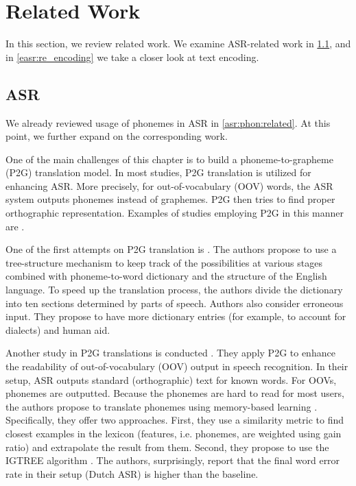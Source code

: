 \section{Related Work}
\label{easr:related}
In this section, we review related work. We examine ASR-related work in \cref{easr:rel_asr}, and in \cref{easr:re_encoding} we take a closer look at text encoding.

\subsection{ASR}
\label{easr:rel_asr}
We already reviewed usage of phonemes in ASR in \cref{asr:phon:related}. At this point, we further expand on the corresponding work.

One of the main challenges of this chapter is to build a phoneme-to-grapheme (P2G) translation model. In most studies, P2G translation is utilized for enhancing ASR. More precisely, for out-of-vocabulary (OOV) words, the ASR system outputs phonemes instead of graphemes. P2G then tries to find proper orthographic representation. Examples of studies employing P2G in this manner are .

One of the first attempts on P2G translation is . The authors propose to use a tree-structure mechanism to keep track of the possibilities at various stages combined with phoneme-to-word dictionary and the structure of the English language. To speed up the translation process, the authors divide the dictionary into ten sections determined by parts of speech. Authors also consider erroneous input. They propose to have more dictionary entries (for example, to account for dialects) and human aid.

Another study in P2G translations is conducted . They apply P2G to enhance the readability of out-of-vocabulary (OOV) output in speech recognition. In their setup, ASR outputs standard (orthographic) text for known words. For OOVs, phonemes are outputted. Because the phonemes are hard to read for most users, the authors propose to translate phonemes using memory-based learning . Specifically, they offer two approaches. First, they use a similarity metric to find closest examples in the lexicon (features, i.e. phonemes, are weighted using gain ratio) and extrapolate the result from them. Second, they propose to use the IGTREE algorithm . The authors, surprisingly, report that the final word error rate in their setup (Dutch ASR) is higher than the baseline.


